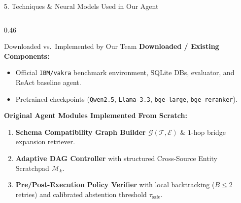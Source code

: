 \documentclass[aspectratio=169, 10pt]{beamer}
\begin{document}
\begin{frame}{5. Techniques \& Neural Models Used in Our Agent}
\begin{columns}[T, onlytextwidth]
\begin{column}{0.46\textwidth}
\begin{exampleblock}{Downloaded vs.\ Implemented by Our Team}
\footnotesize
\textbf{Downloaded / Existing Components:}
\begin{itemize}
    \item Official \texttt{IBM/vakra} benchmark environment, SQLite DBs, evaluator, and ReAct baseline agent.
    \item Pretrained checkpoints (\texttt{Qwen2.5}, \texttt{Llama-3.3}, \texttt{bge-large}, \texttt{bge-reranker}).
\end{itemize}
\vspace{0.15cm}
\textbf{Original Agent Modules Implemented From Scratch:}
\begin{enumerate}
    \item \textbf{Schema Compatibility Graph Builder $\mathcal{G}(\mathcal{T}, \mathcal{E})$} \& $1$-hop bridge expansion retriever.
    \item \textbf{Adaptive DAG Controller} with structured Cross-Source Entity Scratchpad $\mathcal{M}_k$.
    \item \textbf{Pre/Post-Execution Policy Verifier} with local backtracking ($B \le 2$ retries) and calibrated abstention threshold $\tau_{\text{safe}}$.
\end{enumerate}
\end{exampleblock}
\end{column}
\end{columns}
\end{frame}
\end{document}
